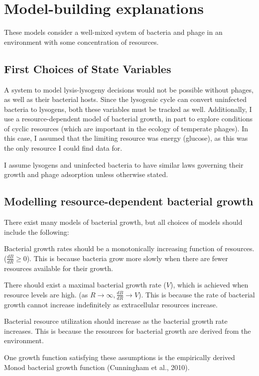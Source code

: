 \documentclass{article}
\begin{document}
\section{Model-building explanations}
 These models consider a well-mixed system of bacteria and phage in an environment with some concentration of resources.

\subsection{First Choices of State Variables}
A system to model lysis-lysogeny decisions would not be possible without phages, as well as their bacterial hosts. Since the lysogenic cycle can convert uninfected bacteria to lysogens, both these variables must be tracked as well. Additionally, I use a resource-dependent model of bacterial growth, in part to explore conditions of cyclic resources (which are important in the ecology of temperate phages). In this case, I assumed that the limiting resource was energy (glucose), as this was the only resource I could find data for. 

I assume lysogens and uninfected bacteria to have similar laws governing their growth and phage adsorption unless otherwise stated.

\subsection{Modelling resource-dependent bacterial growth}
There exist many models of bacterial growth, but all choices of models should include the following:

Bacterial growth rates should be a monotonically increasing function of resources. ($\frac{dB}{dR} \geq 0$). This is because bacteria grow more slowly when there are fewer resources available for their growth. 

There should exist a maximal bacterial growth rate ($V$), which is achieved when resource levels are high. (as $R \rightarrow \infty,  \frac{dB}{dR} \rightarrow V$). This is because the rate of bacterial growth cannot increase indefinitely as extracellular resources increase.

Bacterial resource utilization should increase as the bacterial growth rate increases. This is because the resources for bacterial growth are derived from the environment.

One growth function satisfying these assumptions is the empirically derived Monod bacterial growth function (Cunningham et al., 2010). 
\end{document}
